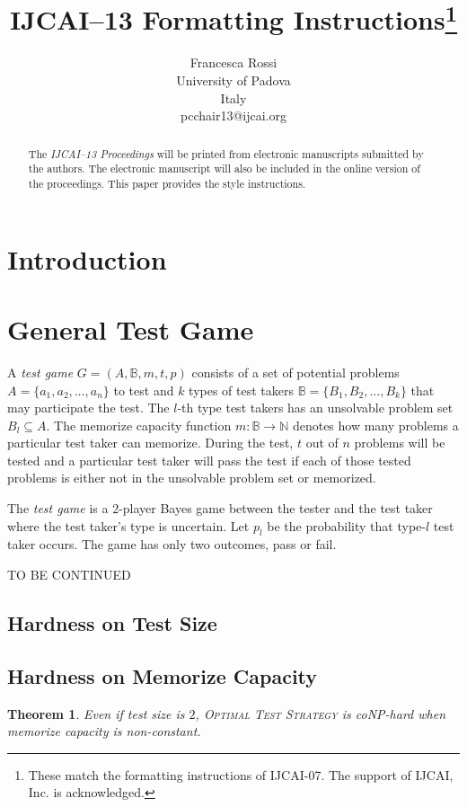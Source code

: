 \documentclass{article}
\title{IJCAI--13 Formatting Instructions\thanks{These match the formatting instructions of IJCAI-07. The support of IJCAI, Inc. is acknowledged.}}
\author{Francesca Rossi \\
University of Padova\\
Italy \\
pcchair13@ijcai.org}
\newtheorem{theorem}{Theorem}
\begin{document}
\maketitle

\begin{abstract}
  The {\it IJCAI--13 Proceedings} will be printed from electronic
  manuscripts submitted by the authors. The electronic manuscript will
  also be included in the online version of the proceedings. This paper
  provides the style instructions.
\end{abstract}

\section{Introduction}

\section{General Test Game}

A \emph{test game} $G = (A, \mathbb B, m, t, p)$ consists of a set of potential
problems $A = \{a_1, a_2, \ldots, a_n\}$ to test and $k$ types of test takers
$\mathbb B = \{B_1, B_2, \ldots, B_k\}$ that may participate the test. The
$l$-th type test takers has an unsolvable problem set $B_l \subseteq A$. The
memorize capacity function $m: \mathbb B \rightarrow \mathbb N$ denotes how
many problems a particular test taker can memorize. During the test, $t$ out of
$n$ problems will be tested and a particular test taker will pass the test if
each of those tested problems is either not in the unsolvable problem set or
memorized. 

The \emph{test game} is a 2-player Bayes game between the tester and
the test taker where the test taker's type is uncertain. Let $p_l$ be the
probability that type-$l$ test taker occurs. The game has only two outcomes,
pass or fail.

TO BE CONTINUED

\subsection{Hardness on Test Size}

\subsection{Hardness on Memorize Capacity}

\begin{theorem}
Even if test size is $2$, \textsc{Optimal Test Strategy} is coNP-hard when
memorize capacity is non-constant.
\end{theorem}
\end{document}
